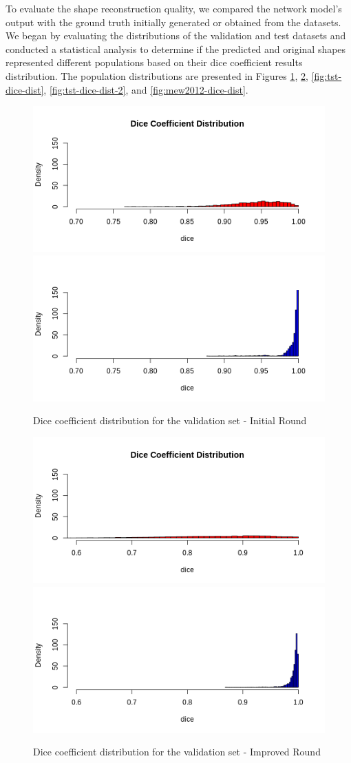 To evaluate the shape reconstruction quality, we compared the network model's output with the ground truth initially generated or obtained from the datasets. We began by evaluating the distributions of the validation and test datasets and conducted a statistical analysis to determine if the predicted and original shapes represented different populations based on their dice coefficient results distribution. The population distributions are presented in Figures \ref{fig:val-dice-dist}, \ref{fig:val-dice-dist-2}, \ref{fig:tst-dice-dist}, \ref{fig:tst-dice-dist-2}, and \ref{fig:mew2012-dice-dist}.

\begin{figure}[h!]
    \centering
    \includegraphics[width=.65\linewidth]{Figures/v1-val-dicedst-d.png}
    \includegraphics[width=.65\linewidth]{Figures/v1-val-dicedst-r.png}
    \caption{Dice coefficient distribution for the validation set - Initial Round}
    \label{fig:val-dice-dist}
\end{figure}

\begin{figure}[h!]
    \centering
    \includegraphics[width=.65\linewidth]{Figures/v2-val-dicedst-d.png}
    \includegraphics[width=.65\linewidth]{Figures/v2-val-dicedst-r.png}
    \caption{Dice coefficient distribution for the validation set - Improved Round}
    \label{fig:val-dice-dist-2}
\end{figure}

